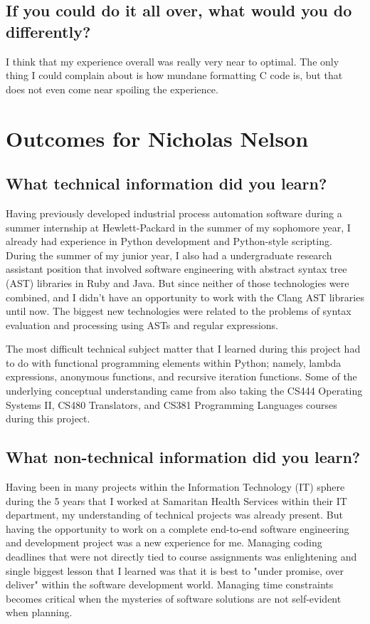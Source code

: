 \documentclass[11pt]{scrreprt}
\begin{document}
\subsection{If you could do it all over, what would you do differently?}

I think that my experience overall was really very near to optimal.
The only thing I could complain about is how mundane formatting C code is, but that does not even come near spoiling the experience.


\section{Outcomes for Nicholas Nelson}

\subsection{What technical information did you learn?}

Having previously developed industrial process automation software during a summer internship at Hewlett-Packard in the summer of my sophomore year, I already had experience in Python development and Python-style scripting. During the summer of my junior year, I also had a undergraduate research assistant position that involved software engineering with abstract syntax tree (AST) libraries in Ruby and Java. But since neither of those technologies were combined, and I didn't have an opportunity to work with the Clang AST libraries until now.
The biggest new technologies were related to the problems of syntax evaluation and processing using ASTs and regular expressions.

The most difficult technical subject matter that I learned during this project had to do with functional programming elements within Python; namely, lambda expressions, anonymous functions, and recursive iteration functions. Some of the underlying conceptual understanding came from also taking the CS444 Operating Systems II, CS480 Translators, and CS381 Programming Languages courses during this project.

\subsection{What non-technical information did you learn?}

Having been in many projects within the Information Technology (IT) sphere during the 5 years that I worked at Samaritan Health Services within their IT department, my understanding of technical projects was already present. But having the opportunity to work on a complete end-to-end software engineering and development project was a new experience for me. Managing coding deadlines that were not directly tied to course assignments was enlightening and single biggest lesson that I learned was that it is best to "under promise, over deliver" within the software development world. Managing time constraints becomes critical when the mysteries of software solutions are not self-evident when planning.
\end{document}
